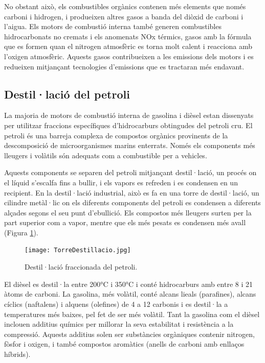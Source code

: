 No obstant aix\`o, els combustibles org\`anics contenen m\'es elements que nom\'es carboni i hidrogen, i produeixen altres gasos a banda del di\`oxid de carboni i l'aigua. Els motors de combusti\'o interna tamb\'e generen combustibles hidrocarbonats no cremats i els anomenats NOx t\'ermics, gasos amb la f\'ormula  que es formen quan el nitrogen atmosf\`eric es torna molt calent i reacciona amb l'oxigen atmosf\`eric. Aquests gasos contribueixen a les emissions dels motors i es redueixen mitjan\c{c}ant tecnologies d'emissions que es tractaran més endavant.


\subsection{Destil·lació del petroli}

La majoria de motors de combustió interna de gasolina i dièsel estan dissenyats per utilitzar fraccions específiques d'hidrocarburs obtingudes del petroli cru. El petroli és una barreja complexa de compostos orgànics provinents de la descomposició de microorganismes marins enterrats. Només els components més lleugers i volàtils són adequats com a combustible per a vehicles\cite{bowers_understanding_2014}.

Aquests components se separen del petroli mitjançant destil·lació, un procés on el líquid s'escalfa fins a bullir, i els vapors es refreden i es condensen en un recipient. En la destil·lació industrial, això es fa en una torre de destil·lació, un cilindre metàl·lic on els diferents components del petroli es condensen a diferents alçades segons el seu punt d'ebullició. Els compostos més lleugers surten per la part superior com a vapor, mentre que els més pesats es condensen més avall (Figura \ref{fig:torredestillacio}).

\begin{figure}
    \centering
    \texttt{[image: TorreDestillacio.jpg]}
    \caption{Destil·lació fraccionada del petroli\cite{noauthor_38_2015}.}
    \label{fig:torredestillacio}
\end{figure}


El dièsel es destil·la entre 200°C i 350°C i conté hidrocarburs amb entre 8 i 21 àtoms de carboni. La gasolina, més volàtil, conté alcans lieals (parafines), alcans cíclics (naftalens) i alquens (olefines) de 4 a 12 carbonis i es destil·la a temperatures més baixes, pel fet de ser més volàtil. Tant la gasolina com el dièsel inclouen additius químics per millorar la seva estabilitat i resistència a la compressió. Aquests additius solen ser substàncies orgàniques contenir nitrogen, fòsfor i oxigen, i també compostos aromàtics (anells de carboni amb enllaços híbrids).

